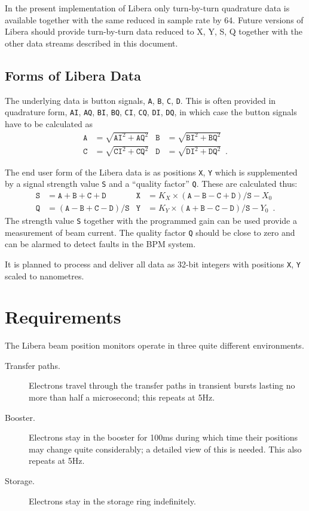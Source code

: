 \documentclass[
    a4paper,
    fleqn
]{article}
\newcommand{\id}[1]{\texttt{#1}}
\newcommand{\XY}{\id{X}, \id{Y}}
\newcommand{\ABCD}{\id{A}, \id{B}, \id{C}, \id{D}}
\newcommand{\ABCDIQ}{%
  \id{AI}, \id{AQ}, \id{BI}, \id{BQ},
  \id{CI}, \id{CQ}, \id{DI}, \id{DQ}}
\begin{document}
In the present implementation of Libera only turn-by-turn quadrature
data is available together with the same reduced in sample rate by 64.
Future versions of Libera should provide turn-by-turn data reduced to
X, Y, S, Q together with the other data streams described in this
document.

\subsection{Forms of Libera Data}

The underlying data is button signals, \ABCD.  This is often provided
in quadrature form, \ABCDIQ, in which case the button signals have to
be calculated as
\begin{align*}
\id{A} &= \sqrt{\id{AI}^2+\id{AQ}^2} &
\id{B} &= \sqrt{\id{BI}^2+\id{BQ}^2} \\
\id{C} &= \sqrt{\id{CI}^2+\id{CQ}^2} &
\id{D} &= \sqrt{\id{DI}^2+\id{DQ}^2}
\enspace.
\end{align*}

The end user form of the Libera data is as positions \XY{} which is
supplemented by a signal strength value \id{S} and a ``quality
factor'' \id{Q}.  These are calculated thus:
\begin{align*}
\id{S} &= \id{A} + \id{B} + \id{C} + \id{D}  &
\id{X} &=
    K_X \times (\id{A} - \id{B} - \id{C} + \id{D}) / \id{S} - X_0 \\
\id{Q} &= (\id{A} - \id{B} + \id{C} - \id{D}) / \id{S} &
\id{Y} &=
    K_Y \times (\id{A} + \id{B} - \id{C} - \id{D}) / \id{S} - Y_0
\enspace.
\end{align*}
The strength value \id{S} together with the programmed gain can be
used provide a measurement of beam current.  The quality factor \id{Q}
should be close to zero and can be alarmed to detect faults in the BPM
system.

It is planned to process and deliver all data as 32-bit integers with
positions \XY{} scaled to nanometres.


\section{Requirements}

The Libera beam position monitors operate in three quite different
environments.
\begin{description}
\item[Transfer paths.]  Electrons travel through the transfer paths in
  transient bursts lasting no more than half a microsecond; this
  repeats at 5Hz.
\item[Booster.]  Electrons stay in the booster for 100ms during which
  time their positions may change quite considerably;  a detailed view
  of this is needed.  This also repeats at 5Hz.
\item[Storage.]  Electrons stay in the storage ring indefinitely.
\end{description}
\end{document}
